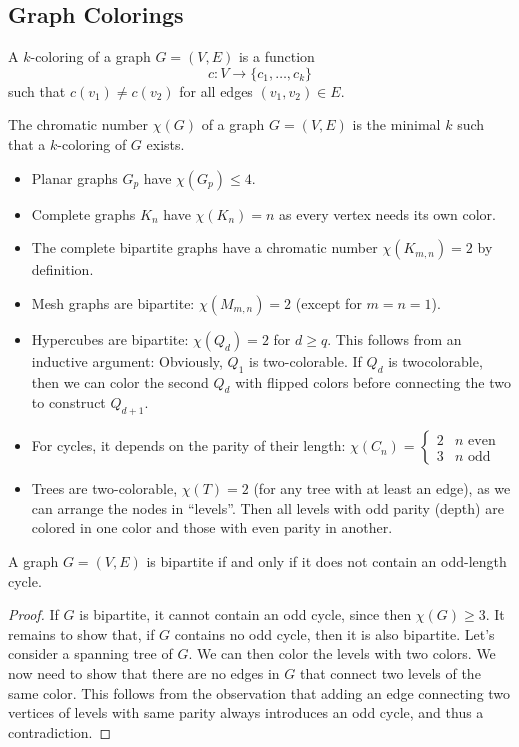 \subsection{Graph Colorings}
\begin{definition}[Coloring]\label{def:coloring}
A \(k\)-coloring of a graph \(G=(V,E)\) is a function
\[
c: V \to \{c_1, \ldots, c_k\}
\]
such that \(c(v_1) \neq c(v_2)\) for all edges \((v_1,v_2) \in E\).
\end{definition}
\begin{definition}\label{def:chromatic-number}
  The chromatic number \(\chi(G)\) of a graph \(G=(V,E)\) is the minimal \(k\) such that a \(k\)-coloring of \(G\) exists.
\end{definition}
\begin{example}\label{ex:chromatic-numbers}
\hfill
\begin{itemize}
\item Planar graphs $G_p$ have
$
\chi(G_p) \leq 4
$.
\item Complete graphs $K_n$ have $\chi(K_n)=n$ as every vertex needs its own color.
\item The complete bipartite graphs have a chromatic number $\chi(K_{m, n})=2$ by definition.
\item Mesh graphs are bipartite: $\chi(M_{m, n})=2$ (except for $m=n=1$).
\item Hypercubes are bipartite: $\chi(Q_d)=2$ for $d \geq q$. This follows from an inductive argument: Obviously, $Q_1$ is two-colorable. If $Q_d$ is twocolorable, then we can color the second $Q_d$ with flipped colors before connecting the two to construct $Q_{d+1}$.
\item For cycles, it depends on the parity of their length:
$
\chi(C_n)= \begin{cases}2 & n \text { even } \\ 3 & n \text { odd }\end{cases}
$
\item Trees are two-colorable, $\chi(T)=2$ (for any tree with at least an edge), as we can arrange the nodes in ``levels''. 
Then all levels with odd parity (depth) are colored in one color and those with even parity in another. \qedhere
\end{itemize}
\end{example}

\begin{theorem}\label{thm:bipartite-cycle}
A graph \(G=(V,E)\) is bipartite if and only if it does not contain an odd-length cycle.
\end{theorem}
\begin{proof}
If $G$ is bipartite, it cannot contain an odd cycle, since then $\chi(G) \geq 3$. 
It remains to show that, if $G$ contains no odd cycle, then it is also bipartite. 
Let's consider a spanning tree of $G$. 
We can then color the levels with two colors. 
We now need to show that there are no edges in $G$ that connect two levels of the same color. 
This follows from the observation that adding an edge connecting two vertices of levels with same parity always introduces an odd cycle, and thus a contradiction.
\end{proof}


